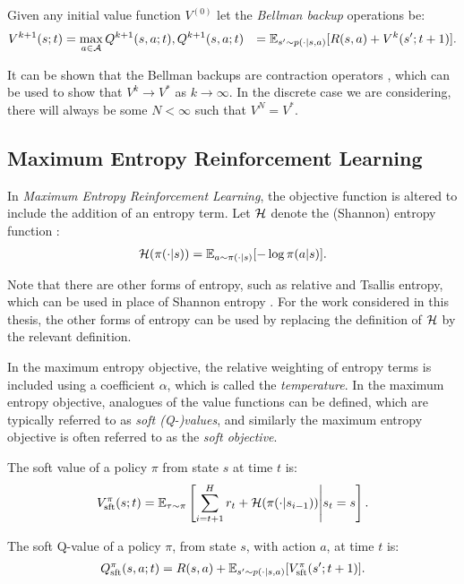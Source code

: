     Given any initial value function $V^{(0)}$ let the \textit{Bellman backup} operations be:
    \begin{align}
        V^{k+1}(s;t) &= \max_{a\in\mathcal{A}} Q^{k+1}(s,a;t),
        Q^{k+1}(s,a;t) &= \mathbb{E}_{s'\sim p(\cdot|s,a)} [R(s,a) + V^k(s';t+1)].
    \end{align}

    It can be shown that the Bellman backups are contraction operators , which can be used to show that $V^{k}\rightarrow V^*$ as $k\rightarrow \infty$. In the discrete  case we are considering, there will always be some $N<\infty$ such that $V^{N}=V^*$.

    \subsection{Maximum Entropy Reinforcement Learning}

        In \textit{Maximum Entropy Reinforcement Learning}, the objective function is altered to include the addition of an entropy term. Let $\mathcal{H}$ denote the (Shannon) entropy function :
        \begin{align}
            \mathcal{H}(\pi(\cdot|s)) = \mathbb{E}_{a\sim\pi(\cdot|s)}[-\log \pi(a|s)].
        \end{align}

        Note that there are other forms of entropy, such as relative and Tsallis entropy, which can be used in place of Shannon entropy . For the work considered in this thesis, the other forms of entropy can be used by replacing the definition of $\mathcal{H}$ by the relevant definition.

        In the maximum entropy objective, the relative weighting of entropy terms is included using a coefficient $\alpha$, which is called the \textit{temperature}. In the maximum entropy objective, analogues of the value functions can be defined, which are typically referred to as \textit{soft (Q-)values}, and similarly the maximum entropy objective is often referred to as the \textit{soft objective}.

        \begin{defn}
            \label{def:sft_value}
            \label{def:sft_q_value}
            The \textnormal{soft value} of a policy $\pi$ from state $s$ at time $t$ is:
            \begin{align}
                V_{\textnormal{sft}}^{\pi}(s;t) = \mathbb{E}_{\tau\sim\pi}\left[\sum_{i=t+1}^H r_t + \mathcal{H}(\pi(\cdot|s_{i-1})) \Bigg| s_t=s \right].
            \end{align} 

            The \textnormal{soft Q-value} of a policy $\pi$, from state $s$, with action $a$, at time $t$ is:
            \begin{align}
                Q_{\textnormal{sft}}^{\pi}(s,a;t) = R(s,a) + \mathbb{E}_{s'\sim p(\cdot|s,a)} [V_{\textnormal{sft}}^{\pi}(s';t+1)].
            \end{align} 
        \end{defn}

